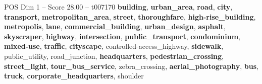 \begin{textsample}{POS Dim 1 – Score 28.00 – t007170}  \label{ex:f1_pos_003}
\textbf{building}, \textbf{urban\_area}, \textbf{road}, \textbf{city}, \textbf{transport}, \textbf{metropolitan\_area}, \textbf{street}, \textbf{thoroughfare}, \textbf{high-rise\_building}, \textbf{metropolis}, \textbf{lane}, \textbf{commercial\_building}, \textbf{urban\_design}, \textbf{asphalt}, \textbf{skyscraper}, \textbf{highway}, \textbf{intersection}, \textbf{public\_transport}, \textbf{condominium}, \textbf{mixed-use}, \textbf{traffic}, \textbf{cityscape}, controlled-access\_highway, \textbf{sidewalk}, public\_utility, road\_junction, \textbf{headquarters}, \textbf{pedestrian\_crossing}, \textbf{street\_light}, \textbf{tour\_bus\_service}, zebra\_crossing, \textbf{aerial\_photography}, \textbf{bus}, \textbf{truck}, \textbf{corporate\_headquarters}, shoulder

\end{textsample}
